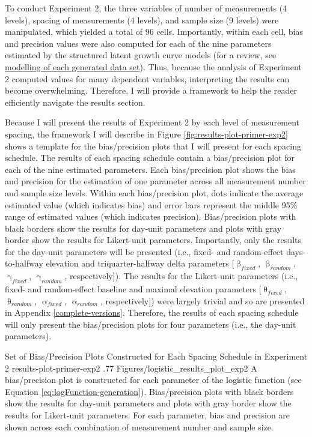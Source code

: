 \documentclass[
12pt, %
twoside,
english]{guelphthesis}
\begin{document}
To conduct Experiment 2, the three variables of number of measurements (4 levels), spacing of measurements (4 levels), and sample size (9 levels) were manipulated, which yielded a total of 96 cells. Importantly, within each cell, bias and precision values were also computed for each of the nine parameters estimated by the structured latent growth curve models (for a review, see \protect\hyperlink{modelling-data-sets}{modelling of each generated data set}). Thus, because the analysis of Experiment 2 computed values for many dependent variables, interpreting the results can become overwhelming. Therefore, I will provide a framework to help the reader efficiently navigate the results section.

Because I will present the results of Experiment 2 by each level of measurement spacing, the framework I will describe in Figure \ref{fig:results-plot-primer-exp2} shows a template for the bias/precision plots that I will present for each spacing schedule. The results of each spacing schedule contain a bias/precision plot for each of the nine estimated parameters. Each bias/precision plot shows the bias and precision for the estimation of one parameter across all measurement number and sample size levels. Within each bias/precision plot, dots indicate the average estimated value (which indicates bias) and error bars represent the middle 95\% range of estimated values (which indicates precision). Bias/precision plots with black borders show the results for day-unit parameters and plots with gray border show the results for Likert-unit parameters. Importantly, only the results for the day-unit parameters will be presented (i.e., fixed- and random-effect days-to-halfway elevation and triquarter-halfway delta parameters {[}\(\upbeta_{fixed}\), \(\upbeta_{random}\), \(\upgamma_{fixed}\), \(\upgamma_{random}\), respectively{]}). The results for the Likert-unit parameters (i.e., fixed- and random-effect baseline and maximal elevation parameters {[}\(\uptheta_{fixed}\), \(\uptheta_{random}\), \(\upalpha_{fixed}\), \(\upalpha_{random}\), respectively{]}) were largely trivial and so are presented in Appendix \ref{complete-versions}. Therefore, the results of each spacing schedule will only present the bias/precision plots for four parameters (i.e., the day-unit parameters).
\begin{apaFigure}
[portrait]
[samepage]
[-0.2cm]
{Set of Bias/Precision Plots Constructed for Each Spacing Schedule in Experiment 2}
{results-plot-primer-exp2}
{.77}
{Figures/logistic_results_plot_exp2}
{A bias/precision plot is constructed for each parameter of the logistic function (see Equation \ref{eq:logFunction-generation}). Bias/precision plots with black borders show the results for day-unit parameters and plots with gray border show the results for Likert-unit parameters. For each parameter, bias and precision are shown across each combination of measurement number and sample size.}
\end{apaFigure}
\end{document}
